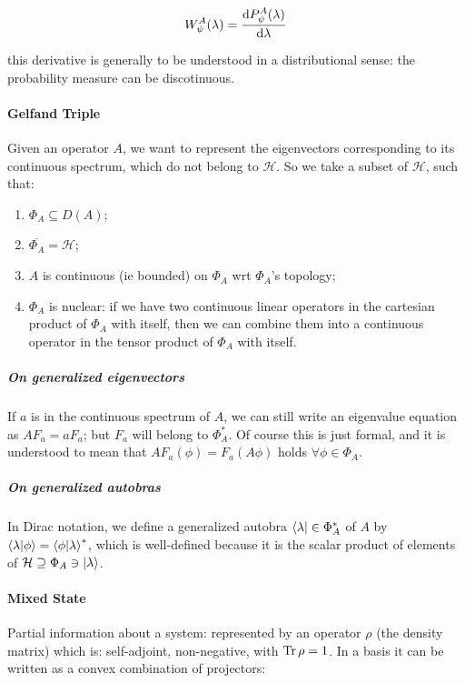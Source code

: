 \documentclass[main.tex]{subfiles}
\begin{document}
\begin{equation}
    W^A_\psi (\lambda) = \dv{P^A_\psi (\lambda)}{\lambda}
\end{equation}

this derivative is generally to be understood in a distributional sense: the probability measure can be discotinuous.

\paragraph{Gelfand Triple} Given an operator $A$, we want to represent the eigenvectors corresponding to its continuous spectrum, which do not belong to $\mathcal{H}$. So we take a subset of $\mathcal{H}$, such that:

\begin{enumerate}
    \item $\Phi_A \subseteq D(A)$;
    \item $\overline{\Phi_A} = \mathcal{H}$;
    \item $A$ is continuous (ie bounded) on $\Phi_A$ wrt $\Phi_A$'s topology;
    \item $\Phi_A$ is nuclear: if we have two continuous linear operators in the cartesian product of $\Phi_A$ with itself, then we can combine them into a continuous operator in the tensor product of $\Phi_A$ with itself.
\end{enumerate}

\subparagraph{On generalized eigenvectors} If $a$ is in the continuous spectrum of $A$, we can still write an eigenvalue equation as $A F_a = a F_a$; but $F_a$ will belong to $\Phi_A^*$. Of course this is just formal, and it is understood to mean that $A F_a (\phi) = F_a (A\phi)$ holds $\forall \phi \in \Phi_A$.

\subparagraph{On generalized autobras} In Dirac notation, we define a generalized autobra $\bra{\lambda} \in \Phi_A^*$ of $A$ by $\braket{\lambda}{\phi} = \braket{\phi}{\lambda}^*$, which is well-defined because it is the scalar product of elements of $\mathcal{H} \supseteq \Phi_A \ni \ket{\lambda}$.

\paragraph{Mixed State} Partial information about a system: represented by an operator $\rho$ (the density matrix) which is: self-adjoint, non-negative, with $\operatorname{Tr} \rho = 1$. In a basis it can be written as a convex combination of projectors:
\end{document}

